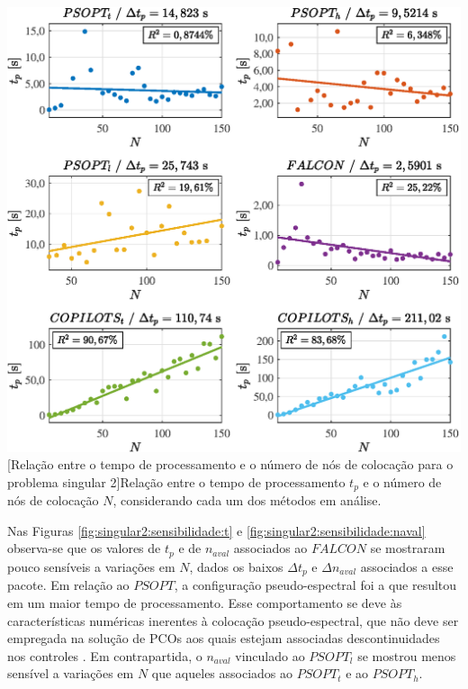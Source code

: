 \noindent
\begin{minipage}{\textwidth}
	\vspace{\onelineskip}
	\centering
	\includegraphics[scale=0.70]{fig/resultados/singular2/sens/t}
	[Relação entre o tempo de processamento e o número de nós de colocação para o problema singular 2]{Relação entre o tempo de processamento $ t_p $ e o número de nós de colocação $ N $, considerando cada um dos métodos em análise.}
	\label{fig:singular2:sensibilidade:t}
	\vspace{\onelineskip}
\end{minipage}

Nas Figuras \ref{fig:singular2:sensibilidade:t} e \ref{fig:singular2:sensibilidade:naval} observa-se que os valores de $ t_p $ e de $ n_{aval} $ associados ao $ FALCON $ se mostraram pouco sensíveis a variações em $ N $, dados os baixos $ \Delta t_p $ e $ \Delta n_{aval} $ associados a esse pacote. Em relação ao $ PSOPT$, a configuração pseudo-espectral foi a que resultou em um maior tempo de processamento. Esse comportamento se deve às características numéricas inerentes à colocação pseudo-espectral, que não deve ser empregada na solução de PCOs aos quais estejam associadas descontinuidades nos controles \cite{becerra_tutorial_2010}. Em contrapartida, o $ n_{aval} $ vinculado ao $ PSOPT_l $ se mostrou menos sensível a variações em $ N $ que aqueles associados ao $ PSOPT_t $ e ao $ PSOPT_h $. 

